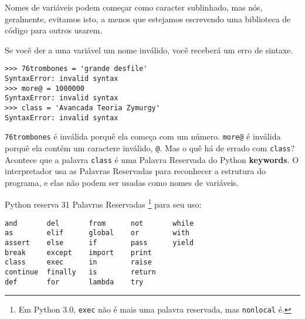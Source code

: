 Nomes de variáveis podem começar como caracter sublinhado, mas
nós, geralmente, evitamos isto, a menos que estejamos escrevendo 
uma biblioteca de código para outros usarem.


Se você der a uma variável um nome inválido, você receberá um erro de sintaxe.

\beforeverb
\begin{verbatim}
>>> 76trombones = 'grande desfile'
SyntaxError: invalid syntax
>>> more@ = 1000000
SyntaxError: invalid syntax
>>> class = 'Avancada Teoria Zymurgy'
SyntaxError: invalid syntax
\end{verbatim}
\afterverb
%

{\tt 76trombones} é inválida porquê ela começa com um número.
{\tt more@} é inválida porquê ela contém um caractere inválido, {\tt @}. 
Mas o quê há de errado com {\tt class}?
Acontece que a palavra {\tt class} é uma Palavra Reservada do Python {\bf keywords}.
O interpretador usa as Palavras Reservadas para reconhecer a estrutura do programa,
e elas não podem ser usadas como nomes de variáveis.



Python reserva 31 Palavras Reservadas \footnote{Em Python 3.0, {\tt exec} não é 
mais uma palavra reservada, mas {\tt nonlocal} é.} para seu uso:

\beforeverb
\begin{verbatim}
and       del       from      not       while    
as        elif      global    or        with     
assert    else      if        pass      yield    
break     except    import    print              
class     exec      in        raise              
continue  finally   is        return             
def       for       lambda    try
\end{verbatim}
\afterverb
%

